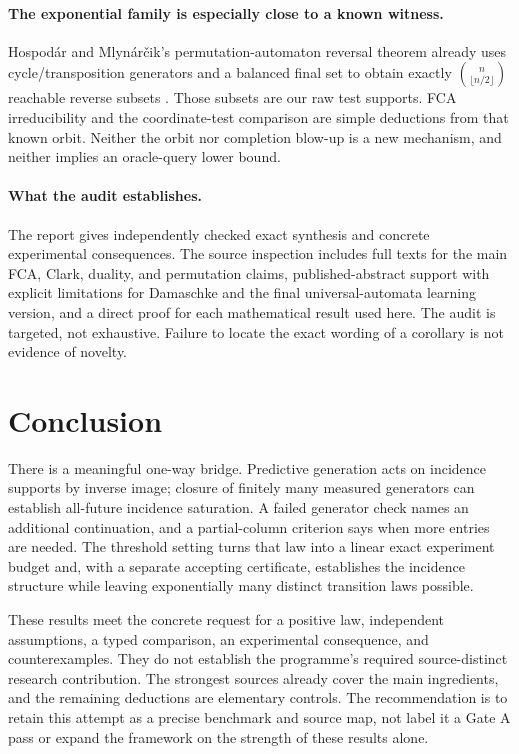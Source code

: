 \documentclass[11pt]{article}
\theoremstyle{remark}
\begin{document}
\paragraph{The exponential family is especially close to a known witness.}
Hospodár and Mlynárčik's permutation-automaton reversal theorem already uses cycle/transposition generators and a balanced final set to obtain exactly $\binom n{\lfloor n/2\rfloor}$ reachable reverse subsets \cite{Permutation}. Those subsets are our raw test supports. FCA irreducibility and the coordinate-test comparison are simple deductions from that known orbit. Neither the orbit nor completion blow-up is a new mechanism, and neither implies an oracle-query lower bound.

\paragraph{What the audit establishes.}
The report gives independently checked exact synthesis and concrete experimental consequences. The source inspection includes full texts for the main FCA, Clark, duality, and permutation claims, published-abstract support with explicit limitations for Damaschke and the final universal-automata learning version, and a direct proof for each mathematical result used here. The audit is targeted, not exhaustive. Failure to locate the exact wording of a corollary is not evidence of novelty.

\section{Conclusion}
\label{sec:conclusion}

There is a meaningful one-way bridge. Predictive generation acts on incidence supports by inverse image; closure of finitely many measured generators can establish all-future incidence saturation. A failed generator check names an additional continuation, and a partial-column criterion says when more entries are needed. The threshold setting turns that law into a linear exact experiment budget and, with a separate accepting certificate, establishes the incidence structure while leaving exponentially many distinct transition laws possible.

These results meet the concrete request for a positive law, independent assumptions, a typed comparison, an experimental consequence, and counterexamples. They do not establish the programme's required source-distinct research contribution. The strongest sources already cover the main ingredients, and the remaining deductions are elementary controls. The recommendation is to retain this attempt as a precise benchmark and source map, not label it a Gate A pass or expand the framework on the strength of these results alone.
\end{document}
